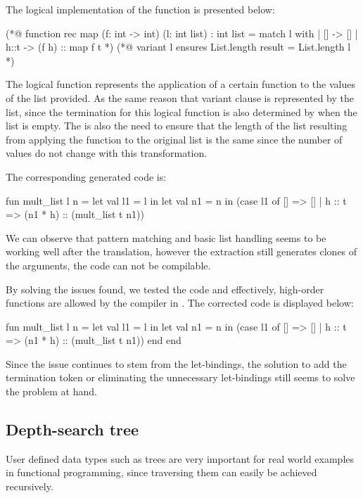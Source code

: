 The logical implementation of the  function is presented below:

\begin{gospell}
(*@ function rec map (f: int -> int) (l: int list) : int list = 
        match l with
        | [] -> []
        | h::t -> (f h) :: map f t *)
(*@ variant l
        ensures List.length result = List.length l *)
\end{gospell}

The logical function  represents the application of a certain function to the values of the list provided. As the same
reason that variant clause is represented by the list, since the termination for this logical function is also determined by when the
list is empty. The is also the need to ensure that the length of the list resulting from applying the function to the original list
is the same since the number of values do not change with this transformation.

The corresponding generated code is:

\begin{cakeml}
fun mult_list l n = let val l1 = l in
    let val n1 = n in
    (case l1 of
        [] => []
    | h :: t => (n1 * h) :: (mult_list t n1))
\end{cakeml}

We can observe that pattern matching and basic list handling seems to be working well after the translation, however the extraction 
still generates clones of the arguments, the code can not be compilable. 

By solving the issues found, we tested the code and effectively, high-order functions are allowed by the compiler in \cml. The corrected 
code is displayed below:

\begin{cakeml}
fun mult_list l n = let val l1 = l in
    let val n1 = n in
    (case l1 of
        [] => []
    | h :: t => (n1 * h) :: (mult_list t n1))
    end end
\end{cakeml}

Since the issue continues to stem from the let-bindings, the solution to add the termination token or eliminating the unnecessary 
let-bindings still seems to solve the problem at hand.

\subsection{Depth-search tree}

User defined data types such as trees are very important for real world examples in functional programming, since traversing them
can easily be achieved recursively. 

